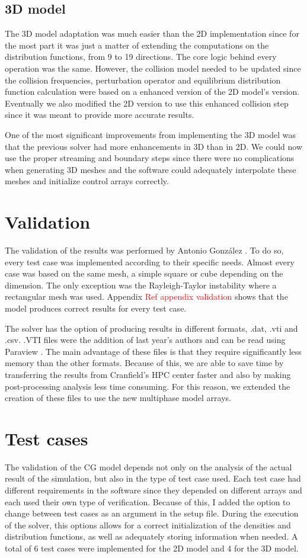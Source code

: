 \documentclass[12pt]{book}
\begin{document}
\subsection{3D model}
The 3D model adaptation was much easier than the 2D implementation since for the most part it was just a matter of extending the computations on the distribution functions, from 9 to 19 directions. The core logic behind every operation was the same. However, the collision model needed to be updated since the collision frequencies, perturbation operator and equilibrium distribution function calculation were based on a enhanced version of the 2D model's version. Eventually we also modified the 2D version to use this enhanced collision step since it was meant to provide more accurate results. \par
One of the most significant improvements from implementing the 3D model was that the previous solver had more enhancements in 3D than in 2D. We could now use the proper streaming and boundary steps since there were no complications when generating 3D meshes and the software could adequately interpolate these meshes and initialize control arrays correctly. 

\section{Validation}
The validation of the results was performed by Antonio González \cite{antonioThesis}. To do so, every test case was implemented according to their specific needs. Almost every case was based on the same mesh, a simple square or cube depending on the dimension. The only exception was the Rayleigh-Taylor instability where a rectangular mesh was used. Appendix \textcolor{red}{Ref appendix validation} shows that the model produces correct results for every test case. \par
The solver has the option of producing results in different formats, .dat, .vti and .csv. .VTI files were the addition of last year's authors and can be read using Paraview \cite{paraview}. The main advantage of these files is that they require significantly less memory than the other formats. Because of this, we are able to save time by transferring the results from Cranfield's HPC center faster and also by making post-processing analysis less time consuming. For this reason, we extended the creation of these files to use the new multiphase model arrays.
\section{Test cases}\label{sec:testcases}
The validation of the CG model depends not only on the analysis of the actual result of the simulation, but also in the type of test case used. Each test case had different requirements in the software since they depended on different arrays and each used their own type of verification. Because of this, I added the option to change between test cases as an argument in the setup file. During the execution of the solver, this options allows for a correct initialization of the densities and distribution functions, as well as adequately storing information when needed.
A total of 6 test cases were implemented for the 2D model and 4 for the 3D model.
\end{document}
